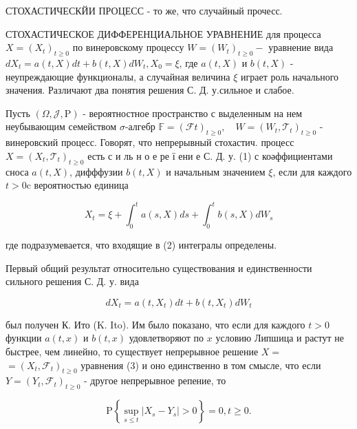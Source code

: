 \documentclass[10pt]{article}
\begin{document}
СТОХАСТИЧЕСКЙИ ПРОЦЕСС - то же, что случайный прочесс.



СТОХАСТИЧЕСКОЕ ДИФФЕРЕНЦИАЛЬНОЕ УРАВНЕНИЕ для процесса $X=\left(X_{t}\right)_{t \geqslant 0}$ по винеровскому процессу $W=\left(W_{t}\right)_{t \geqslant 0}-$ уравнение вида $d X_{t}=a(t, X) d t+b(t, X) d W_{t}, X_{0}=\xi$, где $a(t, X)$ и $b(t, X)$ - неупреждающие функционалы, а случайная величина $\xi$ играет роль начального значения. Различают два понятия решения С. Д. у.сильное и слабое.



Пусть $(\Omega, \mathscr{J}, \mathrm{P})$ - вероятностное пространство с выделенным на нем неубывающим семейством $\sigma$-алгебр $\mathbb{F}=(\mathscr{F} t)_{t \geqslant 0}, \quad W=\left(W_{t}, \mathscr{T}_{t}\right)_{t \geqslant 0}$ - винеровский процесс. Говорят, что непрерывный стохастич. процесс $X=\left(X_{t}, \mathscr{T}_{t}\right)_{t \geqslant 0}$ есть с и ль н о е ре ї ени е С. Д. у. (1) с коәффициентами сноса $a(t, X)$, дифффузии $b(t, X)$ и начальным значением $\xi$, если для каждого $t>0 \mathrm{c}$ вероятностью единица



\[

X_{t}=\xi+\int_{0}^{t} a(s, X) d s+\int_{0}^{t} b(s, X) d W_{s}

\]



где подразумевается, что входящие в (2) интегралы определены.



Первый общий результат относительно существования и единственности сильного решения С. Д. у. вида



\[

d X_{t}=a\left(t, X_{t}\right) d t+b\left(t, X_{t}\right) d W_{t}

\]



был получен К. Ито (K. Ito). Им было показано, что если для каждого $t>0$ функции $a(t, x)$ и $b(t, x)$ удовлетворяют по $x$ условию Липшица и растут не быстрее, чем линейно, то существует непрерывное решение $X=$ $=\left(X_{t}, \mathscr{F}_{t}\right)_{t \geqslant 0}$ уравнения (3) и оно единственно в том смысле, что если $Y=\left(Y_{t}, \mathscr{F}_{t}\right)_{t \geqslant 0}$ - другое непрерывное репение, то



\[

\mathrm{P}\left\{\sup _{s \leqslant t}\left|X_{s}-Y_{s}\right|>0\right\}=0, t \geqslant 0 .

\]
\end{document}
